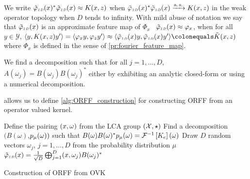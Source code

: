 We write $\tildePhi{1:D}(x)^*\tildePhi{1:D}(x)\approx K(x,z)$ when $\tildePhi{1:D}(x)^*\tildePhi{1:D}(x)\converges{\asurely}{} K(x,z)$ in the weak operator topology when $D$ tends to infinity. With mild abuse of notation we say that $\tildePhi{1:D}(x)$ is an approximate feature map of $\Phi_x$ \ie~$\tildePhi{1:D}(x)\approx \Phi_x$, when for all $y\in\mathcal{Y}$, $\inner{y, K(x,z)y'}=\inner{\Phi_x y, \Phi_z y'}\approx \inner{\tildePhi{1:D}(x)y, \tildePhi{1:D}(x)y'}\colonequals \tilde{K}(x,z)$ where $\Phi_x$ is defined in the sense of \cref{pr:fourier_feature_map}. 

\begin{remark}
We find a decomposition such that for all $j=1, \ldots, D$, $A(\omega_j)=B(\omega_j)B(\omega_j)^*$ either by exhibiting an analytic closed-form or using a numerical decomposition. 
\end{remark}
 allows us to define \cref{alg:ORFF_construction} for constructing \acs{ORFF} from an operator valued kernel.
\begin{center}
\begin{algorithm2e}[H]\label{alg:ORFF_construction}
	\SetAlgoLined
    \BlankLine
	Define the pairing $(x, \omega)$ from the \acs{LCA} group $(\mathcal{X}, \star)$\;
	Find a decomposition $(B(\omega)$,$p_{\mu}(\omega))$ such that $B(\omega)B(\omega)^*p_{\mu}(\omega)=\mathcal{F}^{-1}\left[K_e\right](\omega)$\;
	Draw $D$ random vectors $\omega_j$, $j=1, \hdots, D$ from the probability distribution $\mu$\;
   \Return $\tildePhi{1:D}(x)=\frac{1}{\sqrt{D}}\Vect_{j=1}^D\pairing{x, \omega_j}B(\omega_j)^*$\;
   \caption{Construction of \acs{ORFF} from \acs{OVK}}
   \label{al:ORFF_construction}
\end{algorithm2e}
\end{center}

